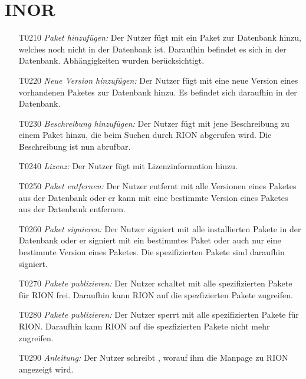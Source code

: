 \section{INOR}

\begin{itemize}
	\item[T0210] \textit{Paket hinzufügen:} Der Nutzer fügt mit  ein Paket zur Datenbank hinzu, welches noch nicht in der Datenbank ist. Daraufhin befindet es sich in der Datenbank. Abhängigkeiten wurden berücksichtigt.
	\item[T0220] \textit{Neue Version hinzufügen:} Der Nutzer fügt mit  eine neue Version eines vorhandenen Paketes zur Datenbank hinzu. Es befindet sich daraufhin in der Datenbank.
	\item[T0230] \textit{Beschreibung hinzufügen:} Der Nutzer fügt mit  jene Beschreibung zu einem Paket hinzu, die beim Suchen durch RION abgerufen wird. Die Beschreibung ist nun abrufbar.
	\item[T0240] \textit{Lizenz:} Der Nutzer fügt mit  Lizenzinformation hinzu.
	\item[T0250] \textit{Paket entfernen:} Der Nutzer entfernt mit  alle Versionen eines Paketes aus der Datenbank oder er kann mit  eine bestimmte Version eines Paketes aus der Datenbank entfernen.
	\item[T0260] \textit{Paket signieren:} Der Nutzer signiert mit  alle installierten Pakete in der Datenbank oder er signiert mit  ein bestimmtes Paket oder auch nur eine bestimmte Version eines Paketes. Die spezifizierten Pakete sind daraufhin signiert.
	\item[T0270] \textit{Pakete publizieren:} Der Nutzer schaltet mit  alle spezifizierten Pakete für RION frei. Daraufhin kann RION auf die spezfizierten Pakete zugreifen.
	\item[T0280] \textit{Pakete publizieren:} Der Nutzer sperrt mit  alle spezifizierten Pakete für RION. Daraufhin kann RION auf die spezfizierten Pakete nicht mehr zugreifen.
	\item[T0290] \textit{Anleitung:} Der Nutzer schreibt , worauf ihm die Manpage zu RION angezeigt wird.
\end{itemize}
